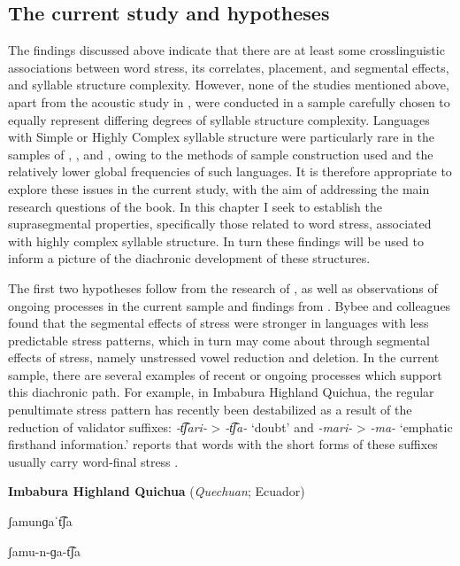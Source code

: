 \subsection{The current study and hypotheses}\label{sec:5.1.3}

  The findings discussed above indicate that there are at least some crosslinguistic associations between word stress, its correlates, placement, and segmental effects, and syllable structure complexity. However, none of the studies mentioned above, apart from the acoustic study in \citet{EasterdayEtAl2011}, were conducted in a sample carefully chosen to equally represent differing degrees of syllable structure complexity. Languages with Simple or Highly Complex syllable structure were particularly rare in the samples of \citet{Auer1993}, \citet{BybeeEtAl1998}, and \citet{Schiering2007}, owing to the methods of sample construction used and the relatively lower global frequencies of such languages. It is therefore appropriate to explore these issues in the current study, with the aim of addressing the main research questions of the book. In this chapter I seek to establish the suprasegmental properties, specifically those related to word stress, associated with highly complex syllable structure. In turn these findings will be used to inform a picture of the diachronic development of these structures.

  The first two hypotheses follow from the research of \citet{BybeeEtAl1998}, as well as observations of ongoing processes in the current sample and findings from . Bybee and colleagues found that the segmental effects of stress were stronger in languages with less predictable stress patterns, which in turn may come about through segmental effects of stress, namely unstressed vowel reduction and deletion. In the current sample, there are several examples of recent or ongoing processes which support this diachronic path. For example, in Imbabura Highland Quichua, the regular penultimate stress pattern has recently been destabilized as a result of the reduction of validator suffixes: \textit{-t͡ʃari-} > \textit{-t͡ʃa-} ‘doubt’ and \textit{-mari-} > \textit{-ma-} ‘emphatic firsthand information.’ \citet{Cole1982} reports that words with the short forms of these suffixes usually carry word-final stress .

\ea\label{ex:5.1}
  \textbf{Imbabura Highland Quichua} (\textit{Quechuan}; Ecuador)

ʃamunɡaˈt͡ʃa

ʃamu-n-ɡa-t͡ʃa

